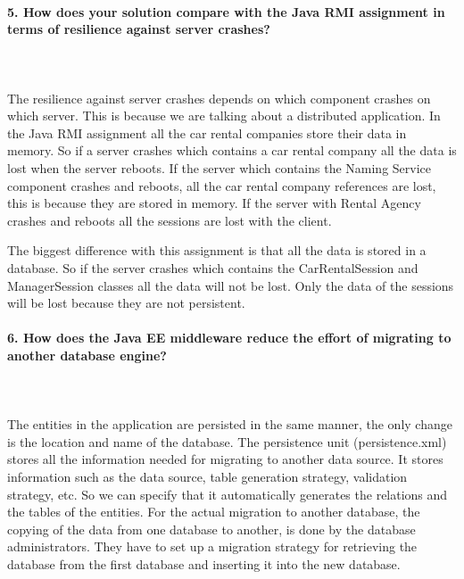 \documentclass{ds-report}
\begin{document}
	\paragraph{5. How does your solution compare with the Java RMI assignment in terms of resilience against server crashes?} \mbox{}\\\\
The resilience against server crashes depends on which component crashes on which server. This is because we are talking about a distributed application. In the Java RMI assignment all the car rental companies store their data in memory. So if a server crashes which contains a car rental company all the data is lost when the server reboots. If the server which contains the Naming Service component crashes and reboots, all the car rental company references are lost, this is because they are stored in memory. If the server with Rental Agency crashes and reboots all the sessions are lost with the client.

The biggest difference with this assignment is that all the data is stored in a database. So if the server crashes which contains the CarRentalSession and ManagerSession classes all the data will not be lost. Only the data of the sessions will be lost because they are not persistent. 


		\paragraph{6. How does the Java EE middleware reduce the effort of migrating to another database engine?} \mbox{}\\\\
The entities in the application are persisted in the same manner, the only change is the location and name of the database. The persistence unit (persistence.xml) stores all the information needed for migrating to another data source. It stores information such as the data source, table generation strategy, validation strategy, etc. So we can specify that it automatically  generates the relations and the tables of the entities.  
For the actual migration to another database, the copying of the data from one database to another, is done by the database administrators. They have to set up a migration strategy for retrieving the database from the first database and inserting it into the new database. 

 
\end{document}
